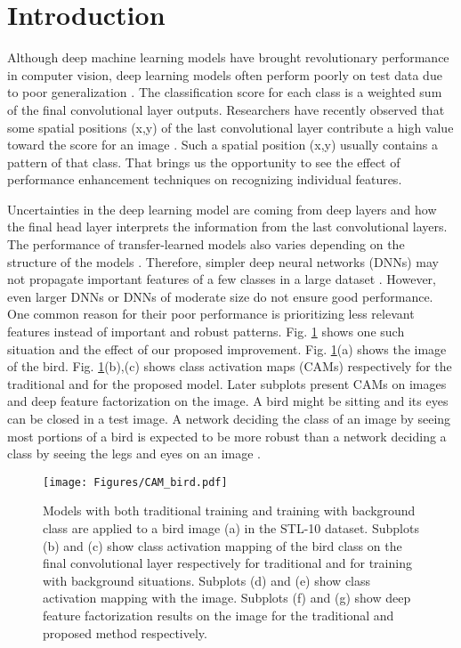 \documentclass{article}
\begin{document}
\section{Introduction} \label{Sec1}
Although deep machine learning models have brought revolutionary performance in computer vision, deep learning models often perform poorly on test data due to poor generalization \cite{caruana2000overfitting}. The classification score for each class is a weighted sum of the final convolutional layer outputs. Researchers have recently observed that some spatial positions (x,y) of the last convolutional layer contribute a high value toward the score for an image \cite{zhou2016learning}. Such a spatial position (x,y) usually contains a pattern of that class. That brings us the opportunity to see the effect of performance enhancement techniques on recognizing individual features.

Uncertainties in the deep learning model are coming from deep layers and how the final head layer interprets the information from the last convolutional layers. The performance of transfer-learned models also varies depending on the structure of the models \cite{kolesnikov2020big}. Therefore, simpler deep neural networks (DNNs) may not propagate important features of a few classes in a large dataset \cite{zagoruyko2016wide}. However, even larger DNNs or DNNs of moderate size do not ensure good performance. One common reason for their poor performance is prioritizing less relevant features instead of important and robust patterns. Fig. \ref{Bird} shows one such situation and the effect of our proposed improvement.  Fig. \ref{Bird}(a) shows the image of the bird. Fig. \ref{Bird}(b),(c) shows class activation maps (CAMs) respectively for the traditional and for the proposed model. Later subplots present CAMs on images and deep feature factorization on the image. A bird might be sitting and its eyes can be closed in a test image. A network deciding the class of an image by seeing most portions of a bird is expected to be more robust than a network deciding a class by seeing the legs and eyes on an image \cite{kapidis2019multitask}. 

\begin{figure}
\vskip 0.2in
\begin{center}
\centerline{\texttt{[image: Figures/CAM\_bird.pdf]}}
\caption{Models with both traditional training and training with background class are applied to a bird image (a) in the STL-10 dataset. Subplots (b) and (c) show class activation mapping of the bird class on the final convolutional layer respectively for traditional and for training with background situations. Subplots (d) and (e) show class activation mapping with the image. Subplots (f) and (g) show deep feature factorization results on the image for the traditional and proposed method respectively.}
\label{Bird}
\end{center}
\vskip -0.2in
\end{figure}
\end{document}

